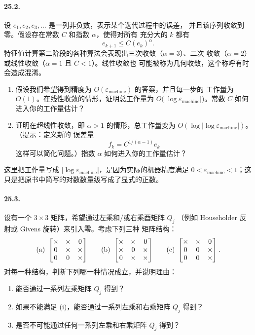 \documentclass[UTF8,fontset=none,12pt]{ctexart}
\newcommand{\epsmach}{\varepsilon_{\mathrm{machine}}}
\begin{document}
\paragraph{25.2.}
设 $e_1,e_2,e_3,\ldots$ 是一列非负数，表示某个迭代过程中的误差，
并且该序列收敛到零。假设存在常数 $C$ 和指数 $\alpha$，使得对所有
充分大的 $k$ 都有
\[
 e_{k+1}\le C(e_k)^\alpha.
\]
特征值计算第二阶段的各种算法会表现出三次收敛（$\alpha=3$）、二次
收敛（$\alpha=2$）或线性收敛（$\alpha=1$ 且 $C<1$）。线性收敛也
可能被称为几何收敛，这个称呼有时会造成混淆。

\begin{enumerate}[label=(\alph*)]
  \item 假设我们希望得到精度为 $O(\epsmach)$ 的答案，并且每一步的
  工作量为 $O(1)$。在线性收敛的情形，证明总工作量为
  $O\bigl(|\log\epsmach|\bigr)$。常数 $C$ 如何进入你的工作量估计？
  \item 证明在超线性收敛，即 $\alpha>1$ 的情形，总工作量变为
  $O\!\left(\log\left|\log\epsmach\right|\right)$。（提示：定义新的
  误差量
  \[
   f_k=C^{1/(\alpha-1)}e_k
  \]
  这样可以简化问题。）指数 $\alpha$ 如何进入你的工作量估计？
\end{enumerate}

这里把工作量写成 $|\log\epsmach|$，是因为实际的机器精度满足
$0<\epsmach<1$；这只是把原书中简写的对数数量级写成了显式的正数。

\paragraph{25.3.}
设有一个 $3\times3$ 矩阵，希望通过左乘和/或右乘酉矩阵 $Q_j$
（例如 Householder 反射或 Givens 旋转）来引入零。考虑下列三种
矩阵结构：
\[
\begin{array}{c@{\qquad}c@{\qquad}c}
\text{(a)}\ \begin{bmatrix}
 \times&\times&0\\0&\times&\times\\0&0&\times
\end{bmatrix}
&
\text{(b)}\ \begin{bmatrix}
 \times&\times&0\\\times&0&\times\\0&\times&\times
\end{bmatrix}
&
\text{(c)}\ \begin{bmatrix}
 \times&\times&0\\0&0&\times\\0&0&\times
\end{bmatrix}.
\end{array}
\]
对每一种结构，判断下列哪一种情况成立，并说明理由：
\begin{enumerate}[label=(\roman*)]
  \item 能否通过一系列左乘矩阵 $Q_j$ 得到？
  \item 如果不能满足 (i)，能否通过一系列左乘和右乘矩阵 $Q_j$ 得到？
  \item 是否不可能通过任何一系列左乘和右乘矩阵 $Q_j$ 得到？
\end{enumerate}
\end{document}
